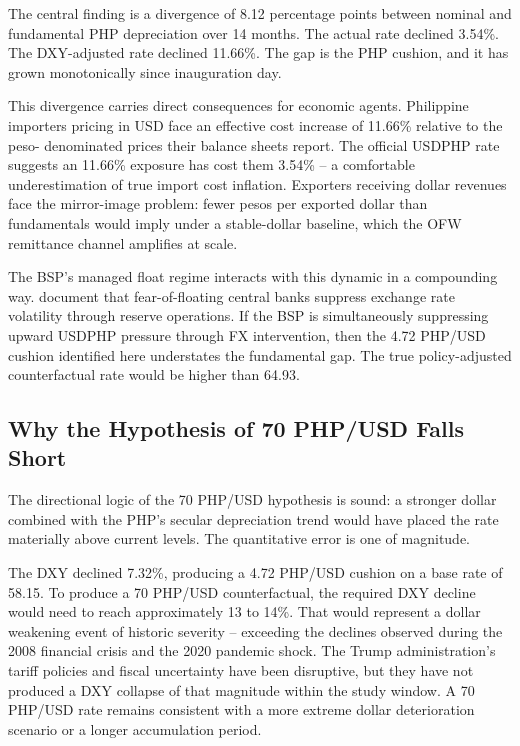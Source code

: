 \documentclass[12pt]{article}
\begin{document}
The central finding is a divergence of 8.12 percentage points between nominal and
fundamental PHP depreciation over 14 months. The actual rate declined 3.54\%. The
DXY-adjusted rate declined 11.66\%. The gap is the PHP cushion, and it has grown
monotonically since inauguration day.

This divergence carries direct consequences for economic agents. Philippine importers
pricing in USD face an effective cost increase of 11.66\% relative to the peso-
denominated prices their balance sheets report. The official USDPHP rate suggests an
11.66\% exposure has cost them 3.54\% -- a comfortable underestimation of true import
cost inflation. Exporters receiving dollar revenues face the mirror-image problem: 
fewer pesos per exported dollar than fundamentals would imply under a stable-dollar
baseline, which the OFW remittance channel amplifies at scale.

The BSP's managed float regime interacts with this dynamic in a compounding way.
\citet{calvo2002} document that fear-of-floating central banks suppress exchange rate
volatility through reserve operations. If the BSP is simultaneously suppressing upward
USDPHP pressure through FX intervention, then the 4.72 PHP/USD cushion identified
here understates the fundamental gap. The true policy-adjusted counterfactual rate
would be higher than 64.93.

\subsection{Why the Hypothesis of 70 PHP/USD Falls Short}

The directional logic of the 70 PHP/USD hypothesis is sound: a stronger dollar
combined with the PHP's secular depreciation trend would have placed the rate
materially above current levels. The quantitative error is one of magnitude.

The DXY declined 7.32\%, producing a 4.72 PHP/USD cushion on a base rate of 58.15.
To produce a 70 PHP/USD counterfactual, the required DXY decline would need to reach
approximately 13 to 14\%. That would represent a dollar weakening event of historic
severity -- exceeding the declines observed during the 2008 financial crisis and the
2020 pandemic shock. The Trump administration's tariff policies and fiscal uncertainty
have been disruptive, but they have not produced a DXY collapse of that magnitude
within the study window. A 70 PHP/USD rate remains consistent with a more extreme
dollar deterioration scenario or a longer accumulation period.
\end{document}
